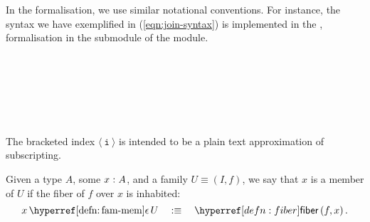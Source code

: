 In the \veragda{} formalisation, we use similar notational conventions. For instance, the
syntax we have exemplified in (\ref{eqn:join-syntax}) is implemented in the \veragda{},
formalisation in the  submodule of the  module.
\begin{code}%
\>[0]\AgdaSpace{}%
\AgdaSpace{}%
\AgdaSymbol{(}\AgdaSpace{}%
\AgdaSymbol{:}\AgdaSpace{}%
\AgdaSpace{}%
\AgdaSymbol{)}\AgdaSpace{}%
\AgdaSymbol{\{}\AgdaSpace{}%
\AgdaSymbol{:}\AgdaSpace{}%
\AgdaSymbol{\}}\AgdaSpace{}%
\AgdaSymbol{(}\AgdaSpace{}%
\AgdaSymbol{:}\AgdaSpace{}%
\AgdaSpace{}%
\AgdaSpace{}%
\AgdaSpace{}%
\AgdaSpace{}%
\AgdaSymbol{)}\AgdaSpace{}%
\<%
\\
%
\\[\AgdaEmptyExtraSkip]%
\>[0][@{}l@{\AgdaIndent{0}}]%
\>[2]\AgdaSpace{}%
\AgdaSymbol{:}\AgdaSpace{}%
\AgdaSymbol{\{}\AgdaSpace{}%
\AgdaSymbol{:}\AgdaSpace{}%
\AgdaSpace{}%
\AgdaSymbol{\}}\AgdaSpace{}%
\AgdaSpace{}%
\AgdaSymbol{(}\AgdaSpace{}%
\AgdaSpace{}%
\AgdaSymbol{)}\AgdaSpace{}%
\AgdaSpace{}%
\<%
\\
%
\>[2]\AgdaSpace{}%
\AgdaSymbol{\{}\AgdaSpace{}%
\AgdaSymbol{=}\AgdaSpace{}%
\AgdaSymbol{\}}\AgdaSpace{}%
\AgdaSpace{}%
\AgdaSymbol{=}\AgdaSpace{}%
\AgdaSpace{}%
\AgdaSymbol{(}\AgdaSpace{}%
\AgdaOperator{\AgdaInductiveConstructor{,}}\AgdaSpace{}%
\AgdaSymbol{)}\<%
\\
%
\\[\AgdaEmptyExtraSkip]%
%
\>[2]\AgdaSpace{}%
\AgdaSpace{}%
\AgdaSpace{}%
\AgdaSpace{}%
\AgdaSpace{}%
\AgdaSymbol{)}\AgdaSpace{}%
\AgdaSymbol{=}\AgdaSpace{}%
\AgdaSpace{}%
\AgdaSpace{}%
\AgdaSpace{}%
\<%
\end{code}

The bracketed index $\mathtt{⟨~i~⟩}$ is intended to be a plain text approximation of
subscripting.

\begin{defn}\label{defn:fam-mem}
  Given a type $A$, some $x\hspace{0.1mm}:\hspace{0.1mm}A$, and a family $U \equiv (I, f)$, we say
  that $x$ is a member of $U$ if the fiber of $f$ over $x$ is inhabited:
  \begin{equation*}
    \memfam{x}{U} \quad\is\quad \fiber{f}{x}.
  \end{equation*}
\end{defn}

